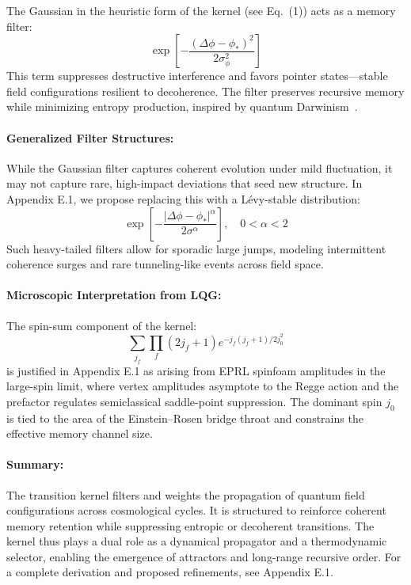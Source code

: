 The Gaussian in the heuristic form of the kernel (see Eq.~(1)) acts as a memory filter:
\[
\exp\left[-\frac{(\Delta\phi - \phi_*)^2}{2\sigma_\phi^2}\right]
\]
This term suppresses destructive interference and favors pointer states—stable field configurations resilient to decoherence. The filter preserves recursive memory while minimizing entropy production, inspired by quantum Darwinism~\cite{zurek2003decoherence}.

\paragraph{Generalized Filter Structures:}

While the Gaussian filter captures coherent evolution under mild fluctuation, it may not capture rare, high-impact deviations that seed new structure. In Appendix E.1, we propose replacing this with a Lévy-stable distribution:
\[
\exp\left[-\frac{|\Delta\phi - \phi_*|^\alpha}{2\sigma^\alpha}\right], \quad 0 < \alpha < 2
\]
Such heavy-tailed filters allow for sporadic large jumps, modeling intermittent coherence surges and rare tunneling-like events across field space.

\paragraph{Microscopic Interpretation from LQG:}

The spin-sum component of the kernel:
\[
\sum_{j_f} \prod_f (2j_f + 1) e^{-j_f(j_f+1)/2j_0^2}
\]
is justified in Appendix E.1 as arising from EPRL spinfoam amplitudes in the large-spin limit, where vertex amplitudes asymptote to the Regge action and the prefactor regulates semiclassical saddle-point suppression. The dominant spin \( j_0 \) is tied to the area of the Einstein–Rosen bridge throat and constrains the effective memory channel size.

\paragraph{Summary:}

The transition kernel filters and weights the propagation of quantum field configurations across cosmological cycles. It is structured to reinforce coherent memory retention while suppressing entropic or decoherent transitions. The kernel thus plays a dual role as a dynamical propagator and a thermodynamic selector, enabling the emergence of attractors and long-range recursive order. For a complete derivation and proposed refinements, see Appendix E.1.

